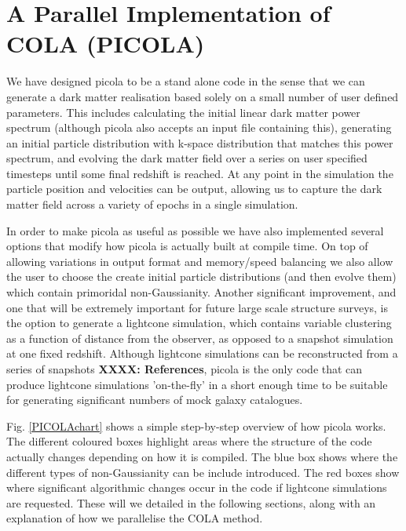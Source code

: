 \documentclass[5p,authoryear]{elsarticle}
\begin{document}
\section{A Parallel Implementation of COLA (PICOLA)}

We have designed {\sc picola} to be a stand alone code in the sense that we can generate a dark matter realisation based solely on a small number of user defined parameters. This includes calculating the initial linear dark matter power spectrum (although {\sc picola} also accepts an input file containing this), generating an initial particle distribution with k-space distribution that matches this power spectrum, and evolving the dark matter field over a series on user specified timesteps until some final redshift is reached. At any point in the simulation the particle position and velocities can be output, allowing us to capture the dark matter field across a variety of epochs in a single simulation. 

In order to make {\sc picola} as useful as possible we have also implemented several options that modify how {\sc picola} is actually built at compile time. On top of allowing variations in output format and memory/speed balancing we also allow the user to choose the create initial particle distributions (and then evolve them) which contain primoridal non-Gaussianity. Another significant improvement, and one that will be extremely important for future large scale structure surveys, is the option to generate a lightcone simulation, which contains variable clustering as a function of distance from the observer, as opposed to a snapshot simulation at one fixed redshift. Although lightcone simulations can be reconstructed from a series of snapshots \textbf{XXXX: References}, {\sc picola} is the only code that can produce lightcone simulations 'on-the-fly' in a short enough time to be suitable for generating significant numbers of mock galaxy catalogues.

Fig. \ref{PICOLAchart} shows a simple step-by-step overview of how {\sc picola} works. The different coloured boxes highlight areas where the structure of the code actually changes depending on how it is compiled. The blue box shows where the different types of non-Gaussianity can be include introduced. The red boxes show where significant algorithmic changes occur in the code if lightcone simulations are requested. These will we detailed in the following sections, along with an explanation of how we parallelise the COLA method.
\end{document}
